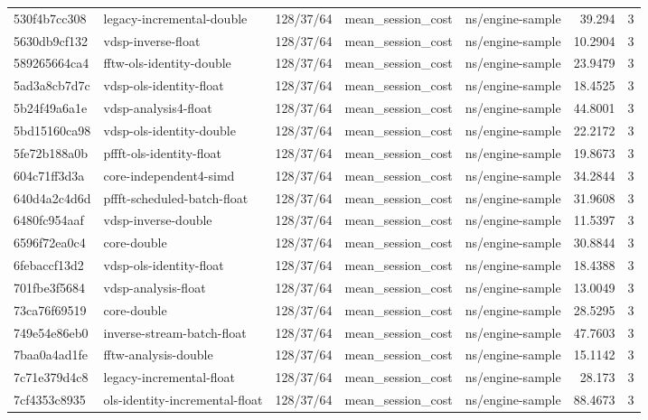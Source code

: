 \begin{longtable}{lllllrr}
530f4b7cc308 & legacy-incremental-double & 128/37/64 & mean\_session\_cost & ns/engine-sample & 39.294 & 3 \\
5630db9cf132 & vdsp-inverse-float & 128/37/64 & mean\_session\_cost & ns/engine-sample & 10.2904 & 3 \\
589265664ca4 & fftw-ols-identity-double & 128/37/64 & mean\_session\_cost & ns/engine-sample & 23.9479 & 3 \\
5ad3a8cb7d7c & vdsp-ols-identity-float & 128/37/64 & mean\_session\_cost & ns/engine-sample & 18.4525 & 3 \\
5b24f49a6a1e & vdsp-analysis4-float & 128/37/64 & mean\_session\_cost & ns/engine-sample & 44.8001 & 3 \\
5bd15160ca98 & vdsp-ols-identity-double & 128/37/64 & mean\_session\_cost & ns/engine-sample & 22.2172 & 3 \\
5fe72b188a0b & pffft-ols-identity-float & 128/37/64 & mean\_session\_cost & ns/engine-sample & 19.8673 & 3 \\
604c71ff3d3a & core-independent4-simd & 128/37/64 & mean\_session\_cost & ns/engine-sample & 34.2844 & 3 \\
640d4a2c4d6d & pffft-scheduled-batch-float & 128/37/64 & mean\_session\_cost & ns/engine-sample & 31.9608 & 3 \\
6480fc954aaf & vdsp-inverse-double & 128/37/64 & mean\_session\_cost & ns/engine-sample & 11.5397 & 3 \\
6596f72ea0c4 & core-double & 128/37/64 & mean\_session\_cost & ns/engine-sample & 30.8844 & 3 \\
6febaccf13d2 & vdsp-ols-identity-float & 128/37/64 & mean\_session\_cost & ns/engine-sample & 18.4388 & 3 \\
701fbe3f5684 & vdsp-analysis-float & 128/37/64 & mean\_session\_cost & ns/engine-sample & 13.0049 & 3 \\
73ca76f69519 & core-double & 128/37/64 & mean\_session\_cost & ns/engine-sample & 28.5295 & 3 \\
749e54e86eb0 & inverse-stream-batch-float & 128/37/64 & mean\_session\_cost & ns/engine-sample & 47.7603 & 3 \\
7baa0a4ad1fe & fftw-analysis-double & 128/37/64 & mean\_session\_cost & ns/engine-sample & 15.1142 & 3 \\
7c71e379d4c8 & legacy-incremental-float & 128/37/64 & mean\_session\_cost & ns/engine-sample & 28.173 & 3 \\
7cf4353c8935 & ols-identity-incremental-float & 128/37/64 & mean\_session\_cost & ns/engine-sample & 88.4673 & 3 \\

\end{longtable}
